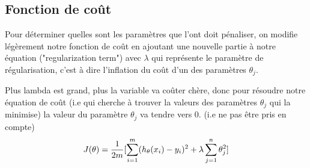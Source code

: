 \documentclass{article}
\theoremstyle{definition}
\begin{document}
\subsection{Fonction de coût}
Pour déterminer quelles sont les paramètres que l'ont doit pénaliser, on modifie légèrement notre fonction de coût en ajoutant une nouvelle partie à notre équation ("regularization term") avec $\lambda$ qui représente le paramètre de régularisation, c'est à dire l'inflation du coût d'un des paramètres $\theta_j$. \par
Plus lambda est grand, plus la variable va coûter chère, donc pour résoudre notre équation de coût (i.e qui cherche à trouver la valeurs des paramètres $\theta_j$ qui la minimise) la valeur du paramètre $\theta_j$ va tendre vers 0. (i.e ne pas être pris en compte)
\begin{equation}
J(\theta) = {1\over 2m}[ \sum_{i=1}^{m} (h_\theta (x_i) - y_i)^2 + \lambda \sum_{j=1}^{n} \theta_j^{2}]
\end{equation}
\end{document}
